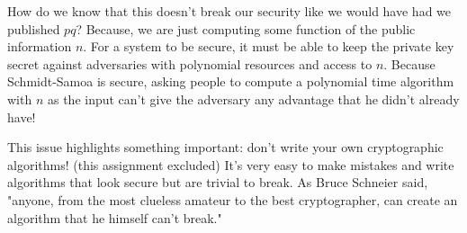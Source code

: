 How do we know that this doesn't break our security like we would have had we published $pq$?
Because, we are just computing some function of the public information $n$.
For a system to be secure, it must be able to keep the private key secret against adversaries
with polynomial resources and access to $n$. Because Schmidt-Samoa is secure, asking people
to compute a polynomial time algorithm with $n$ as the input can't give the adversary any advantage
that he didn't already have!

This issue highlights something important: don't write your own cryptographic algorithms! (this assignment excluded)
It's very easy to make mistakes and write algorithms that look secure but are trivial to break.
As Bruce Schneier said, "anyone, from the most clueless amateur to the best cryptographer,
can create an algorithm that he himself can't break."
